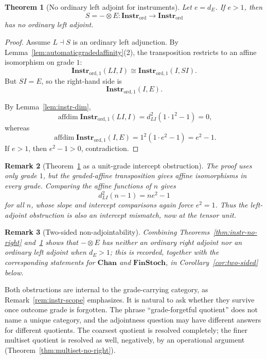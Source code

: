 \documentclass[11pt]{article}
\newtheorem{theorem}{Theorem}[section]
\newtheorem{remark}[theorem]{Remark}
\DeclareMathOperator{\affdim}{affdim}
\begin{document}
\begin{theorem}[No ordinary left adjoint for instruments]
\label{thm:instr-no-left}
Let $e=d_E$. If $e>1$, then
\[
S=-\otimes E:\mathbf{Instr}_{\mathrm{ord}}\to
\mathbf{Instr}_{\mathrm{ord}}
\]
has no ordinary left adjoint.
\end{theorem}

\begin{proof}
Assume $L\dashv S$ is an ordinary left adjunction. By
Lemma~\ref{lem:automaticgradedaffinity}(2), the transposition restricts to
an affine isomorphism on grade $1$:
\[
\mathbf{Instr}_{\mathrm{ord},1}(LI,I)
\cong
\mathbf{Instr}_{\mathrm{ord},1}(I,SI).
\]
But $SI=E$, so the right-hand side is
\[
\mathbf{Instr}_{\mathrm{ord},1}(I,E).
\]

By Lemma~\ref{lem:instr-dim},
\[
\affdim\mathbf{Instr}_{\mathrm{ord},1}(LI,I)
=
d_{LI}^2(1\cdot1^2-1)=0,
\]
whereas
\[
\affdim\mathbf{Instr}_{\mathrm{ord},1}(I,E)
=
1^2(1\cdot e^2-1)=e^2-1.
\]
If $e>1$, then $e^2-1>0$, contradiction.
\end{proof}

\begin{remark}[Theorem~\ref{thm:instr-no-left} as a unit-grade intercept
obstruction]
\label{rem:instr-left-intercept}
The proof uses only grade $1$, but the graded-affine transposition gives
affine isomorphisms in every grade. Comparing the affine functions of $n$
gives
\[
d_{LI}^2(n-1)=ne^2-1
\]
for all $n$, whose slope and intercept comparisons again force $e^2=1$.
Thus the left-adjoint obstruction is also an intercept mismatch, now at the
tensor unit.
\end{remark}

\begin{remark}[Two-sided non-adjointability]
\label{rem:instr-two-sided-preview}
Combining Theorems~\ref{thm:instr-no-right} and~\ref{thm:instr-no-left}
shows that $-\otimes E$ has neither an ordinary right adjoint nor an
ordinary left adjoint when $d_E>1$; this is recorded, together with the
corresponding statements for $\mathbf{Chan}$ and $\mathbf{FinStoch}$, in
Corollary~\ref{cor:two-sided} below.
\end{remark}

Both obstructions are internal to the grade-carrying category, as
Remark~\ref{rem:instr-scope} emphasizes. It is natural to ask whether they
survive once outcome grade is forgotten. The phrase ``grade-forgetful
quotient'' does not name a unique category, and the adjointness question may have
different answers for different quotients. The coarsest quotient is resolved
completely; the finer multiset quotient is resolved as well, negatively, by an
operational argument (Theorem~\ref{thm:multiset-no-right}).
\end{document}
